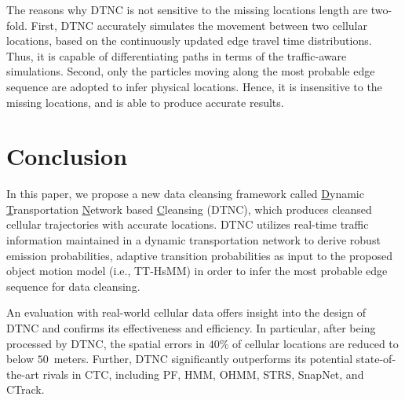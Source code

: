 \documentclass{vldb}
\begin{document}
		The reasons why DTNC is not sensitive to the missing locations length are two-fold.
		First, DTNC accurately simulates the movement between two cellular locations, based on the continuously updated edge travel time distributions.
		Thus, it is capable of differentiating paths in terms of the traffic-aware simulations. %
		Second, %
		only the particles moving along the most probable edge sequence are adopted to infer physical locations.
		Hence, it is insensitive to the missing locations, and is able to produce accurate results.	
	
	
	\section{Conclusion}
	\label{sec:conclusion}
	
	In this paper, we propose a new data cleansing framework called \underline{D}ynamic \underline{T}ransportation \underline{N}etwork based \underline{C}leansing (DTNC), which produces cleansed cellular trajectories with accurate locations. %
	DTNC utilizes real-time traffic information maintained in a dynamic transportation network to derive robust emission probabilities, adaptive transition probabilities as input to the proposed object motion model (i.e., TT-HsMM) in order to infer the most probable edge sequence for data cleansing.
	
	An evaluation with real-world cellular data offers insight into the design of DTNC and confirms its effectiveness and efficiency.
	In particular, after being processed by DTNC, the spatial errors in $40\%$ of cellular locations are reduced to below $50$~meters. 
	Further, DTNC significantly outperforms its potential state-of-the-art rivals in CTC, including  PF, HMM, OHMM, STRS, SnapNet, and CTrack.
	
	{
		\small
		
		 
	}
		
\end{document}
